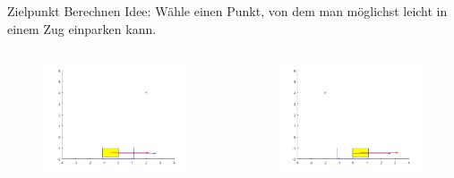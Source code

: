 \begin{frame}{Zielpunkt Berechnen}
	Idee: Wähle einen Punkt, von dem man möglichst leicht in einem Zug einparken kann.
	
	\begin{columns}
		\begin{column}{0.5\textwidth}
			\begin{figure}
				\centering
				\includegraphics[width=\textwidth]{images/ex2step1example1.png}
			\end{figure}
		\end{column}
		\begin{column}{0.5\textwidth}
			\begin{figure}
				\centering
				\includegraphics[width=\textwidth]{images/ex2step1example2.png}
			\end{figure}
		\end{column}
	\end{columns}
	
\end{frame}